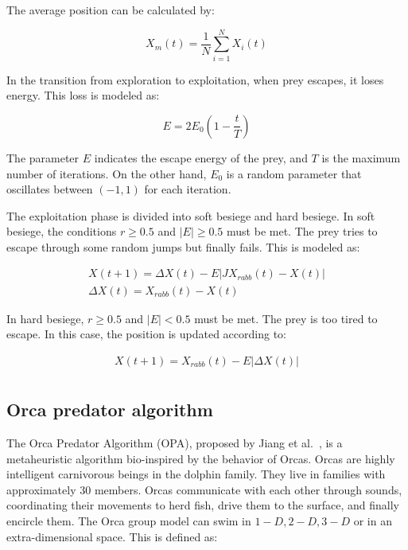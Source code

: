 \documentclass{elsarticle}
\begin{document}
The average position can be calculated by:

\begin{equation}
X_m (t) = \frac{1}{N} \sum_{i=1}^{N} X_i(t) 
\label{eq14}
\end{equation}

In the transition from exploration to exploitation, when prey escapes, it loses energy. This loss is modeled as:

\begin{equation}
E = 2 E_0 (1 - \frac{t}{T}) 
\label{eq15}
\end{equation}

The parameter $E$ indicates the escape energy of the prey, and $T$ is the maximum number of iterations. On the other hand, $E_0$ is a random parameter that oscillates between $(-1,1)$ for each iteration.

The exploitation phase is divided into soft besiege and hard besiege. In soft besiege, the conditions $r \geq 0.5$ and $|E| \geq 0.5$ must be met. The prey tries to escape through some random jumps but finally fails. This is modeled as:

\begin{equation}
\begin{gathered}
X(t+1) = \Delta X(t) - E |J X_{rabb}(t) -X(t)| \\
\Delta X(t) = X_{rabb}(t) - X(t)
\end{gathered}
\label{eq16}
\end{equation}

In hard besiege, $r \geq 0.5$ and $|E| < 0.5$ must be met. The prey is too tired to escape. In this case, the position is updated according to:

\begin{equation}
\begin{gathered}
X(t+1) = X_{rabb}(t) - E |\Delta X(t)| \\
\end{gathered}
\label{eq17}
\end{equation}

\subsection{Orca predator algorithm}

The Orca Predator Algorithm (OPA), proposed by Jiang et al.~\cite{Jiang2022}, is a metaheuristic algorithm bio-inspired by the behavior of Orcas. Orcas are highly intelligent carnivorous beings in the dolphin family. They live in families with approximately 30 members. Orcas communicate with each other through sounds, coordinating their movements to herd fish, drive them to the surface, and finally encircle them. The Orca group model can swim in $1-D, 2-D, 3-D$ or in an extra-dimensional space. This is defined as:
\end{document}
